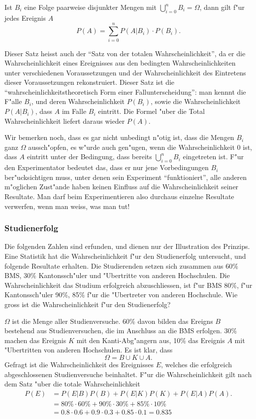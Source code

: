 \begin{satz}
Ist $B_i$ eine Folge paarweise disjunkter Mengen mit $\bigcup_{i=0}^{n}B_i=\Omega$, dann gilt f"ur jedes Ereignis $A$
\[
P(A)=\sum_{i=0}^{n}P(A|B_i)\cdot P(B_i).
\]
\end{satz}
Dieser Satz heisst auch der ``Satz von der totalen Wahrscheinlichkeit'',
da er die Wahrscheinlichkeit eines Ereignisses aus den bedingten
Wahrscheinlichkeiten unter verschiedenen Voraussetzungen und der
Wahrscheinlichkeit des Eintretens dieser Voraussetzungen rekonstruiert.
Dieser Satz ist die ``wahrscheinlichkeitstheoretisch Form einer
Fallunterscheidung'': man kennnt die F"alle $B_i$, und deren Wahrscheinlichkeit
$P(B_i)$, sowie die Wahrscheinlichkeit $P(A|B_i)$, dass $A$ im Falle 
$B_i$ eintritt. Die Formel "uber die Total Wahrscheinlichkeit
liefert daraus wieder $P(A)$.

Wir bemerken noch, dass es gar nicht unbedingt n"otig ist, dass die Mengen
$B_i$ ganz $\Omega$ aussch"opfen, es w"urde auch
gen"ugen, wenn die Wahrscheinlichkeit $0$ ist, dass $A$ eintritt
unter der Bedingung,
dass bereits $\bigcup_{i=0}^{n}B_i$ eingetreten ist.
F"ur den
Experimentator bedeutet das, dass er nur jene Vorbedingungen $B_i$
ber"ucksichtigen muss, unter denen sein Experiment ``funktioniert'',
alle anderen m"oglichen Zust"ande haben keinen Einfluss auf
die Wahrscheinlichkeit seiner Resultate. Man darf beim Experimentieren
also durchaus einzelne Resultate verwerfen, wenn man weiss, was man tut!

\subsubsection{Studienerfolg}
Die folgenden Zahlen sind erfunden, und dienen nur der Illustration
des Prinzips. Eine Statistik hat die Wahrscheinlichkeit f"ur den
Studienerfolg untersucht, und folgende Resultate erhalten.
Die Studierenden setzen sich zusammen aus 60\% BMS, 30\% Kantonssch"uler
und "Ubertritte von anderen Hochschulen. Die Wahrscheinlichkeit
das Studium erfolgreich abzuschliessen, ist f"ur BMS 80\%,
f"ur Kantonssch"uler 90\%, 85\% f"ur die "Ubertreter von anderen
Hochschule. Wie gross ist die Wahrscheinlichkeit f"ur den Studienerfolg?

$\Omega$ ist die Menge aller Studienversuche. 60\% davon bilden das
Ereigns $B$ bestehend aus Studienversuchen, die im Anschluss an die BMS
erfolgen. 30\% machen das Ereignis $K$ mit den Kanti-Abg"angern aus,
10\% das Ereignis $A$ mit "Ubertritten von anderen Hochschulen. Es ist
klar, dass 
\[
\Omega = B \cup K\cup A.
\]
Gefragt ist die Wahrscheinlichkeit des Ereignisses $E$, welches
die erfolgreich abgeschlossenen Studienversuche beinhaltet.
F"ur die Wahrscheinlichkeit gilt nach dem Satz "uber die totale
Wahrscheinlichkeit
\begin{align*}
P(E)&=P(E|B)P(B)+P(E|K)P(K)+P(E|A)P(A).
\\
    &= 80\%\cdot 60\%
     + 90\%\cdot 30\%
     + 85\%\cdot 10\%
\\
&=0.8\cdot 0.6 + 0.9 \cdot 0.3 + 0.85 \cdot 0.1 = 0.835
\end{align*}

